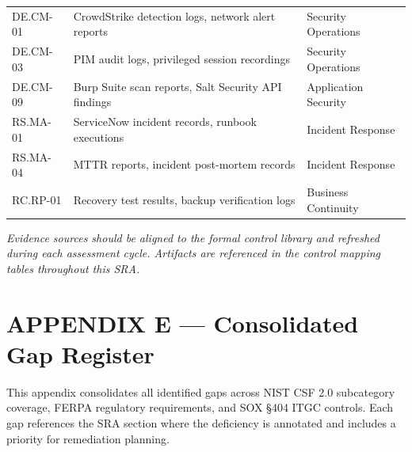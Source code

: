 \documentclass[11pt,landscape]{article}
\begin{document}
\begin{longtable}{lp{3.5in}p{2in}}
DE.CM-01 & CrowdStrike detection logs, network alert reports & Security Operations \\
DE.CM-03 & PIM audit logs, privileged session recordings & Security Operations \\
DE.CM-09 & Burp Suite scan reports, Salt Security API findings & Application Security \\
RS.MA-01 & ServiceNow incident records, runbook executions & Incident Response \\
RS.MA-04 & MTTR reports, incident post-mortem records & Incident Response \\
RC.RP-01 & Recovery test results, backup verification logs & Business Continuity \\
\bottomrule
\end{longtable}

{\small\textit{Evidence sources should be aligned to the formal control library and refreshed
during each assessment cycle. Artifacts are referenced in the control mapping tables
throughout this SRA.}}

\newpage

\section{APPENDIX E --- Consolidated Gap Register}
\label{app:gaps}

This appendix consolidates all identified gaps across NIST CSF 2.0 subcategory coverage,
FERPA regulatory requirements, and SOX §404 ITGC controls. Each gap references the SRA
section where the deficiency is annotated and includes a priority for remediation planning.

\vspace{0.3cm}
\end{document}
